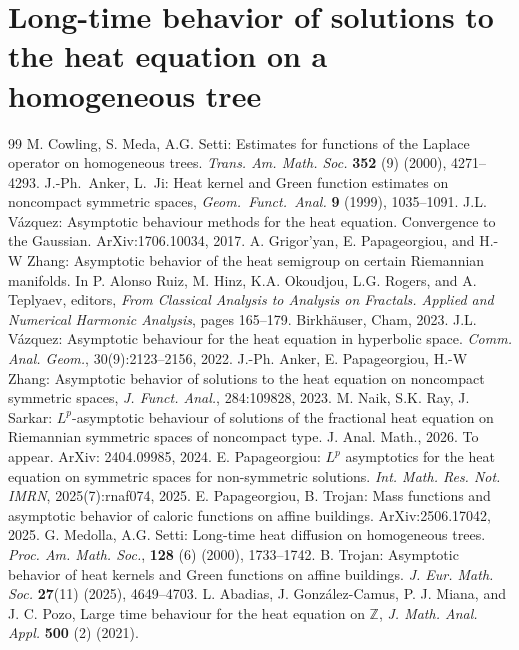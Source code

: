 \documentclass[10pt,a4paper]{amsart}
\theoremstyle{plain}
\theoremstyle{remark}
\theoremstyle{definition}
\begin{document}
	

	\section{Long-time behavior of solutions to the heat equation on a homogeneous tree} \label{sec:T}

\begin{thebibliography}{99}
 M. Cowling, S. Meda, A.G. Setti: Estimates for functions of the Laplace operator on homogeneous trees. \textit{Trans. Am. Math. Soc.} \textbf{352} (9) (2000), 4271--4293.
 J.-Ph.\ Anker, L.\ Ji: Heat kernel and Green function estimates on noncompact symmetric spaces, \textit{Geom.\ Funct.\ Anal.} \textbf{9} (1999), 1035--1091.
 J.L. Vázquez: Asymptotic behaviour methods for the heat equation. Convergence to the Gaussian. ArXiv:1706.10034, 2017.
 A. Grigor’yan, E. Papageorgiou, and H.-W Zhang: Asymptotic behavior of the heat semigroup on certain Riemannian manifolds. In P. Alonso Ruiz, M. Hinz, K.A. Okoudjou, L.G. Rogers, and A. Teplyaev, editors, \textit{From Classical Analysis to Analysis on Fractals. Applied and Numerical Harmonic Analysis}, pages 165--179. Birkhäuser, Cham, 2023.
 J.L. Vázquez: Asymptotic behaviour for the heat equation in hyperbolic space. \textit{Comm. Anal. Geom.}, 30(9):2123--2156, 2022.
 J.-Ph. Anker, E. Papageorgiou, H.-W Zhang: Asymptotic behavior of solutions to the heat equation on noncompact symmetric spaces, \textit{J. Funct. Anal.}, 284:109828, 2023.
 M. Naik, S.K. Ray, J. Sarkar: $L^p$-asymptotic behaviour of solutions of the fractional heat equation on Riemannian symmetric spaces of noncompact type. {J. Anal. Math.}, 2026. To appear. ArXiv: 2404.09985, 2024.
 E. Papageorgiou: $L^p$ asymptotics for the heat equation on symmetric spaces for non-symmetric solutions. \textit{Int. Math. Res. Not. IMRN}, 2025(7):rnaf074, 2025.
 E. Papageorgiou, B. Trojan: Mass functions and asymptotic behavior of caloric functions on affine buildings. ArXiv:2506.17042, 2025.
 G. Medolla, A.G. Setti: Long-time heat diffusion on homogeneous trees. \textit{Proc. Am. Math. Soc.}, \textbf{128} (6) (2000), 1733--1742.
 B. Trojan: Asymptotic behavior of heat kernels and Green functions on affine buildings. \textit{J. Eur. Math. Soc.} \textbf{27}(11) (2025), 4649--4703.
 L. Abadias, J. González-Camus, P. J. Miana, and J. C. Pozo, Large time behaviour for the heat equation on $\mathbb{Z}$, \textit{J. Math. Anal. Appl.} \textbf{500} (2) (2021).

\end{thebibliography}
\end{document}
